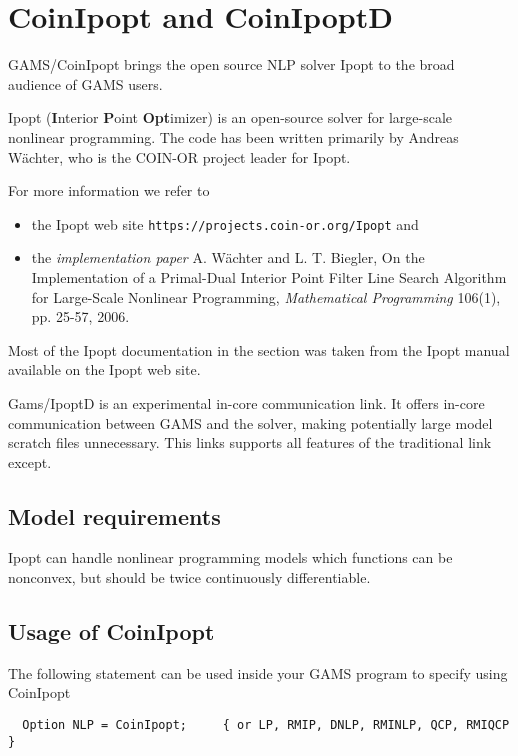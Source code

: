 




\section{CoinIpopt and CoinIpoptD}

GAMS/CoinIpopt brings the open source NLP solver Ipopt to the broad audience of GAMS users.

Ipopt (\textbf{I}nterior \textbf{P}oint \textbf{Opt}imizer) is an open-source solver for large-scale nonlinear programming.
The code has been written primarily by Andreas W\"achter, who is the COIN-OR project leader for Ipopt.

For more information we refer to
\begin{itemize}
\item the Ipopt web site \texttt{https://projects.coin-or.org/Ipopt} and
\item the \emph{implementation paper} A. W\"achter and L. T. Biegler, On the Implementation of a Primal-Dual Interior Point Filter Line Search Algorithm for Large-Scale Nonlinear Programming, \emph{Mathematical Programming} 106(1), pp. 25-57, 2006.
\end{itemize}
Most of the Ipopt documentation in the section was taken from the Ipopt manual available on the Ipopt web site.

Gams/IpoptD is an experimental in-core communication link.
It offers in-core communication between GAMS and the solver, making potentially large model scratch files unnecessary.
This links supports all features of the traditional link except.

\subsection{Model requirements}

Ipopt can handle nonlinear programming models which functions can be nonconvex, but should be twice continuously differentiable.

\subsection{Usage of CoinIpopt}

The following statement can be used inside your GAMS program to specify using CoinIpopt
\begin{verbatim}
  Option NLP = CoinIpopt;     { or LP, RMIP, DNLP, RMINLP, QCP, RMIQCP }
\end{verbatim}


